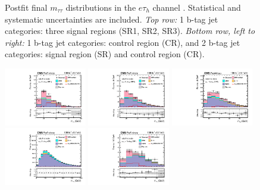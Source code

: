 \begin{figure}[ht]
\begin{center}
    \end{center}
    \caption[Postfit final $m_{\tau\tau}$ distributions in the $e\tau_{h}$ channel]{Postfit final $m_{\tau\tau}$ distributions in the $e\tau_{h}$ channel \cite{CMS-AN-20-213}. Statistical and systematic uncertainties are included. \textit{Top row:} 1 b-tag jet categories: three signal regions (SR1, SR2, SR3). \textit{Bottom row, left to right:} 1 b-tag jet categories: control region (CR), and 2 b-tag jet categories: signal region (SR) and control region (CR).}
    \label{fig:results_mtt_postfit_etall}
\end{figure}

\begin{figure}[ht]
    \begin{center}
        \includegraphics[width=0.32\textwidth]{figures/ch-10-results/em_all_1_post_prelim-yes.pdf}
        \includegraphics[width=0.32\textwidth]{figures/ch-10-results/em_all_2_post_prelim-yes.pdf}
        \includegraphics[width=0.32\textwidth]{figures/ch-10-results/em_all_3_post_prelim-yes.pdf}\\
        \includegraphics[width=0.32\textwidth]{figures/ch-10-results/em_all_4_post_prelim-yes.pdf}
        \includegraphics[width=0.32\textwidth]{figures/ch-10-results/em_all_5_post_prelim-yes.pdf}

\end{center}
\end{figure}
